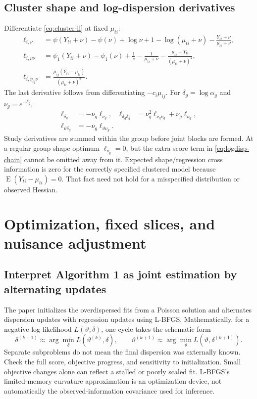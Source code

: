\documentclass[11pt,a4paper]{article}
\newcommand{\E}{\operatorname{E}}
\numberwithin{equation}{section}
\begin{document}
\subsection{Cluster shape and log-dispersion derivatives}
Differentiate \eqref{eq:cluster-ll} at fixed ${\mu_{ti}}$:
\begin{align}
 \ell_{i,\nu}&=\psi(Y_{ti}+\nu)-\psi(\nu)+\log\nu+1
                 -\log({\mu_{ti}}+\nu)-\frac{Y_{ti}+\nu}{{\mu_{ti}}+\nu},\\
 \ell_{i,\nu\nu}&=\psi_1(Y_{ti}+\nu)-\psi_1(\nu)+\frac1\nu
              -\frac1{{\mu_{ti}}+\nu}-\frac{{\mu_{ti}}-Y_{ti}}{({\mu_{ti}}+\nu)^2},\\
 \ell_{i,\eta_{ij}\nu}
 &=\frac{\mu_{ij}(Y_{ti}-{\mu_{ti}})}{({\mu_{ti}}+\nu)^2}.
\end{align}
The last derivative follows from differentiating $-c_i\mu_{ij}$.
For $\delta_g=\log\alpha_g$ and $\nu_g=e^{-\delta_g}$,
\begin{align}
 \ell_{\delta_g}&=-\nu_g\ell_{\nu_g},&
 \ell_{\delta_g\delta_g}&=\nu_g^2\ell_{\nu_g\nu_g}
                                      +\nu_g\ell_{\nu_g},\\
 \ell_{\vartheta\delta_g}&=-\nu_g\ell_{\vartheta\nu_g}. \label{eq:logdisp-chain}
\end{align}
Study derivatives are summed within the group before joint blocks are
formed. At a regular group shape optimum $\ell_{\nu_g}=0$,
but the extra score term in \eqref{eq:logdisp-chain} cannot be omitted
away from it. Expected shape/regression cross information is zero
for the correctly specified clustered model because $\E(Y_{ti}-{\mu_{ti}})=0$.
That fact need not hold for a misspecified distribution or observed Hessian.

\section{Optimization, fixed slices, and nuisance adjustment}\label{sec:optimization}

\subsection{Interpret Algorithm 1 as joint estimation by alternating updates}
The paper initializes the overdispersed fits from a Poisson solution
and alternates dispersion updates with regression updates using L-BFGS.
Mathematically, for a negative log likelihood $L(\vartheta,\delta)$,
one cycle takes the schematic form
\begin{equation}
 \delta^{(k+1)}\approx\arg\min_\delta L(\vartheta^{(k)},\delta),\qquad
 \vartheta^{(k+1)}\approx\arg\min_\vartheta L(\vartheta,\delta^{(k+1)}).
\end{equation}
Separate subproblems do not mean the final dispersion was externally known.
Check the full score, objective progress, and sensitivity to initialization.
Small objective changes alone can reflect a stalled or poorly scaled fit.
L-BFGS's limited-memory curvature approximation is an optimization device,
not automatically the observed-information covariance used for inference.
\end{document}
